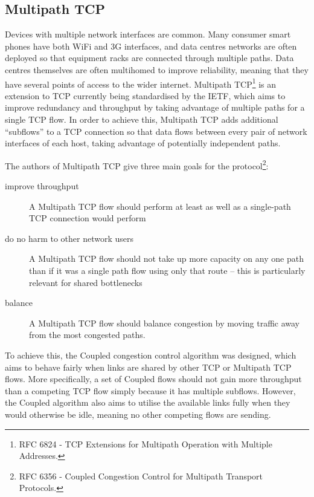 \subsection{Multipath TCP}
\label{sec:bg:mptcp}
Devices with multiple network interfaces are common. Many consumer smart phones
have both WiFi and 3G interfaces, and data centres networks are often deployed
so that equipment racks are connected through multiple paths. Data centres
themselves are often multihomed to improve reliability, meaning that they have
several points of access to the wider internet. Multipath TCP\footnote{RFC 6824
 - TCP Extensions for Multipath Operation with Multiple Addresses.} is an
extension to TCP currently being standardised by the IETF, which aims to improve
redundancy and throughput by taking advantage of multiple paths for a single
TCP flow. In order to achieve this, Multipath TCP adds additional ``subflows''
to a TCP connection so that data flows between every pair of network
interfaces of each host, taking advantage of potentially independent paths.


The authors of Multipath TCP give three main goals for the protocol\footnote{RFC 
6356 - Coupled Congestion Control for Multipath Transport Protocols.}:

\begin{description}
  \item[improve throughput] A Multipath TCP flow should perform at least as well
    as a single-path TCP connection would perform
  \item[do no harm to other network users] A Multipath TCP flow should not take
    up more capacity on any one path than if it was a single path flow using
    only that route -- this is particularly relevant for shared bottlenecks
  \item[balance] A Multipath TCP flow should balance congestion by moving
    traffic away from the most congested paths.
\end{description}

To achieve this, the Coupled congestion control algorithm was designed, which
aims to behave fairly when links are shared by other TCP or Multipath TCP flows.
More specifically, a set of Coupled flows should not gain more throughput than a
competing TCP flow simply because it has multiple subflows. However, the Coupled
algorithm also aims to utilise the available links fully when they would
otherwise be idle, meaning no other competing flows are sending.

